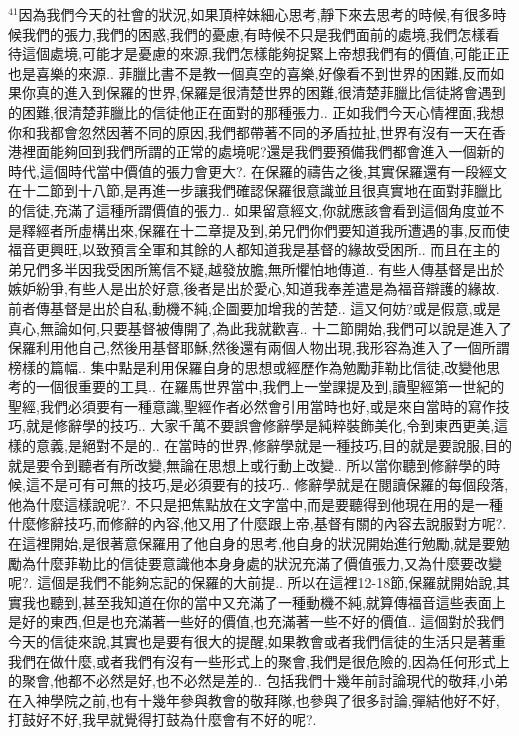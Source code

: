 \documentclass{book}
\begin{document}
$^{41}$因為我們今天的社會的狀況,如果頂梓妹細心思考,靜下來去思考的時候,有很多時候我們的張力,我們的困惑,我們的憂慮,有時候不只是我們面前的處境,我們怎樣看待這個處境,可能才是憂慮的來源,我們怎樣能夠捉緊上帝想我們有的價值,可能正正也是喜樂的來源..
菲臘比書不是教一個真空的喜樂,好像看不到世界的困難,反而如果你真的進入到保羅的世界,保羅是很清楚世界的困難,很清楚菲臘比信徒將會遇到的困難,很清楚菲臘比的信徒他正在面對的那種張力..
正如我們今天心情裡面,我想你和我都會忽然因著不同的原因,我們都帶著不同的矛盾拉扯,世界有沒有一天在香港裡面能夠回到我們所謂的正常的處境呢?還是我們要預備我們都會進入一個新的時代,這個時代當中價值的張力會更大?.
在保羅的禱告之後,其實保羅還有一段經文在十二節到十八節,是再進一步讓我們確認保羅很意識並且很真實地在面對菲臘比的信徒,充滿了這種所謂價值的張力..
如果留意經文,你就應該會看到這個角度並不是釋經者所虛構出來,保羅在十二章提及到,弟兄們你們要知道我所遭遇的事,反而使福音更興旺,以致預言全軍和其餘的人都知道我是基督的緣故受困所..
而且在主的弟兄們多半因我受困所篤信不疑,越發放膽,無所懼怕地傳道..
有些人傳基督是出於嫉妒紛爭,有些人是出於好意,後者是出於愛心,知道我奉差遣是為福音辯護的緣故.前者傳基督是出於自私,動機不純,企圖要加增我的苦楚..
這又何妨?或是假意,或是真心,無論如何,只要基督被傳開了,為此我就歡喜..
十二節開始,我們可以說是進入了保羅利用他自己,然後用基督耶穌,然後還有兩個人物出現,我形容為進入了一個所謂榜樣的篇幅..
集中點是利用保羅自身的思想或經歷作為勉勵菲勒比信徒,改變他思考的一個很重要的工具..
在羅馬世界當中,我們上一堂課提及到,讀聖經第一世紀的聖經,我們必須要有一種意識,聖經作者必然會引用當時也好,或是來自當時的寫作技巧,就是修辭學的技巧..
大家千萬不要誤會修辭學是純粹裝飾美化,令到東西更美,這樣的意義,是絕對不是的..
在當時的世界,修辭學就是一種技巧,目的就是要說服,目的就是要令到聽者有所改變,無論在思想上或行動上改變..
所以當你聽到修辭學的時候,這不是可有可無的技巧,是必須要有的技巧..
修辭學就是在閱讀保羅的每個段落,他為什麼這樣說呢?.
不只是把焦點放在文字當中,而是要聽得到他現在用的是一種什麼修辭技巧,而修辭的內容,他又用了什麼跟上帝,基督有關的內容去說服對方呢?.
在這裡開始,是很著意保羅用了他自身的思考,他自身的狀況開始進行勉勵,就是要勉勵為什麼菲勒比的信徒要意識他本身身處的狀況充滿了價值張力,又為什麼要改變呢?.
這個是我們不能夠忘記的保羅的大前提..
所以在這裡12-18節,保羅就開始說,其實我也聽到,甚至我知道在你的當中又充滿了一種動機不純,就算傳福音這些表面上是好的東西,但是也充滿著一些好的價值,也充滿著一些不好的價值..
這個對於我們今天的信徒來說,其實也是要有很大的提醒,如果教會或者我們信徒的生活只是著重我們在做什麼,或者我們有沒有一些形式上的聚會,我們是很危險的,因為任何形式上的聚會,他都不必然是好,也不必然是差的..
包括我們十幾年前討論現代的敬拜,小弟在入神學院之前,也有十幾年參與教會的敬拜隊,也參與了很多討論,彈結他好不好,打鼓好不好,我早就覺得打鼓為什麼會有不好的呢?.
\end{document}
